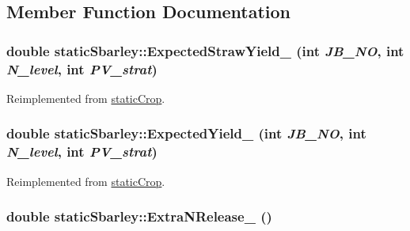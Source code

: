 \subsection{Member Function Documentation}
\hypertarget{classstatic_sbarley_af3f013e0672eacf54def3f0733e9f724}{
\subsubsection[{ExpectedStrawYield\_\-}]{\setlength{\rightskip}{0pt plus 5cm}double staticSbarley::ExpectedStrawYield\_\- (int {\em JB\_\-NO}, \/  int {\em N\_\-level}, \/  int {\em PV\_\-strat})}}
\label{classstatic_sbarley_af3f013e0672eacf54def3f0733e9f724}


Reimplemented from \hyperlink{classstatic_crop_a884a8335aebc5effa3fecdb75af3ca85}{staticCrop}.\hypertarget{classstatic_sbarley_ae99475c54df7437405ebe7152dc78763}{
\subsubsection[{ExpectedYield\_\-}]{\setlength{\rightskip}{0pt plus 5cm}double staticSbarley::ExpectedYield\_\- (int {\em JB\_\-NO}, \/  int {\em N\_\-level}, \/  int {\em PV\_\-strat})}}
\label{classstatic_sbarley_ae99475c54df7437405ebe7152dc78763}


Reimplemented from \hyperlink{classstatic_crop_ab7b9a8ecb31b10c4dcf44f13000e2f8c}{staticCrop}.\hypertarget{classstatic_sbarley_a400c4a118f22704806f91b1a44ea3aea}{
\subsubsection[{ExtraNRelease\_\-}]{\setlength{\rightskip}{0pt plus 5cm}double staticSbarley::ExtraNRelease\_\- ()}}
\label{classstatic_sbarley_a400c4a118f22704806f91b1a44ea3aea}


